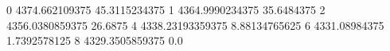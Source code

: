 0 4374.662109375 45.3115234375
1 4364.9990234375 35.6484375
2 4356.0380859375 26.6875
4 4338.23193359375 8.88134765625
6 4331.08984375 1.7392578125
8 4329.3505859375 0.0
